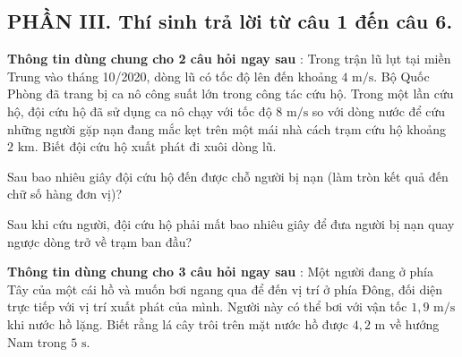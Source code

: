 \subsection*{PHẦN III. Thí sinh trả lời từ câu 1 đến câu 6.}

\noindent\textbf{Thông tin dùng chung cho 2 câu hỏi ngay sau} : Trong trận lũ lụt tại miền Trung vào tháng 10/2020, dòng lũ có tốc độ lên đến khoảng $4\text{ m/s}$. Bộ Quốc Phòng đã trang bị ca nô công suất lớn trong công tác cứu hộ. Trong một lần cứu hộ, đội cứu hộ đã sử dụng ca nô chạy với tốc độ $8\text{ m/s}$ so với dòng nước để cứu những người gặp nạn đang mắc kẹt trên một mái nhà cách trạm cứu hộ khoảng $2\text{ km}$. Biết đội cứu hộ xuất phát đi xuôi dòng lũ.

\begin{ex}
Sau bao nhiêu giây đội cứu hộ đến được chỗ người bị nạn (làm tròn kết quả đến chữ số hàng đơn vị)?

\end{ex}

\begin{ex}
Sau khi cứu người, đội cứu hộ phải mất bao nhiêu giây để đưa người bị nạn quay ngược dòng trở về trạm ban đầu?

\end{ex}

\noindent\textbf{Thông tin dùng chung cho 3 câu hỏi ngay sau} : Một người đang ở phía Tây của một cái hồ và muốn bơi ngang qua để đến vị trí ở phía Đông, đối diện trực tiếp với vị trí xuất phát của mình. Người này có thể bơi với vận tốc $1{,}9\text{ m/s}$ khi nước hồ lặng. Biết rằng lá cây trôi trên mặt nước hồ được $4{,}2\text{ m}$ về hướng Nam trong $5\text{ s}$.

